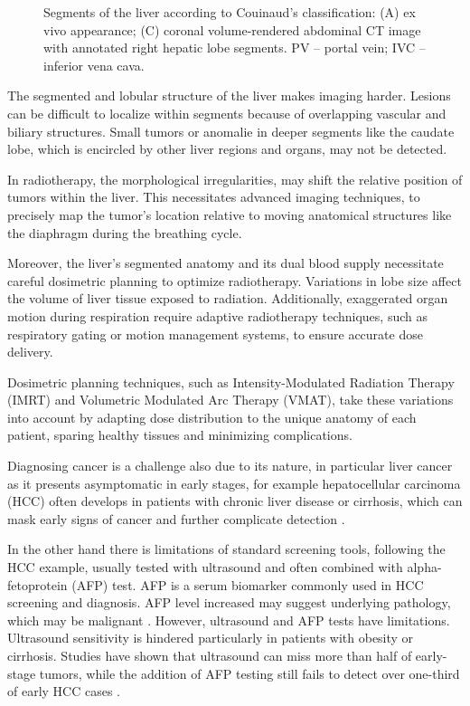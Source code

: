 \begin{figure}[H]
\begin{subfigure}[t]{0.25\textwidth}
		\caption{}
		\label{fig:figure-c}
	\end{subfigure}
	\caption{Segments of the liver according to Couinaud’s classification: (A) ex vivo appearance; (C) coronal volume-rendered abdominal CT image with annotated right hepatic lobe segments. PV – portal vein; IVC – inferior vena cava.}
	\label{fig:liver-segments-side-by-side}
\end{figure}

The segmented and lobular structure of the liver makes imaging harder. Lesions can be difficult to localize within segments because of overlapping vascular and biliary structures. Small tumors or anomalie in deeper segments like the caudate lobe, which is encircled by other liver regions and  organs, may not be detected. \cite{WJGnet2023,liverMassCharacterization2023}

In radiotherapy, the morphological irregularities, may shift the relative position of tumors within the liver. This necessitates advanced imaging techniques, to precisely map the tumor’s location relative to moving anatomical structures like the diaphragm during the breathing cycle. \cite{luersen2015}

Moreover, the liver’s segmented anatomy and its dual blood supply necessitate careful dosimetric planning to optimize radiotherapy. Variations in lobe size affect the volume of liver tissue exposed to radiation. Additionally, exaggerated organ motion during respiration require adaptive radiotherapy techniques, such as respiratory gating or motion management systems, to ensure accurate dose delivery.\cite{pmc5658876}

Dosimetric planning techniques, such as Intensity-Modulated Radiation Therapy (IMRT) and Volumetric Modulated Arc Therapy (VMAT), take these variations into account by adapting dose distribution to the unique anatomy of each patient, sparing healthy tissues and minimizing complications. \cite{oymak2022}

Diagnosing cancer is a challenge also due to its nature, in particular liver cancer as it presents asymptomatic in early stages, for example hepatocellular carcinoma (HCC) often develops in patients with chronic liver disease or cirrhosis, which can mask early signs of cancer and further complicate detection \cite{quaglia2018,doi:10.1148/radiol.14132362}.

In the other hand there is limitations of standard screening tools, following the HCC example, usually tested with ultrasound and often combined with alpha-fetoprotein (AFP) test. AFP is a serum biomarker commonly used in HCC screening and diagnosis. AFP level increased may suggest underlying pathology, which may be malignant \cite{bialecki2005}.
However, ultrasound and AFP tests have limitations. Ultrasound sensitivity is hindered particularly in patients with obesity or cirrhosis.\cite{floridi2022} Studies have shown that ultrasound can miss more than half of early-stage tumors, while the addition of AFP testing still fails to detect over one-third of early HCC cases \cite{mcmahon2023}.

